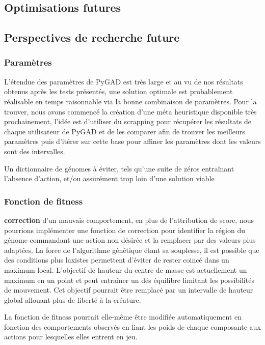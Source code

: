 \documentclass[journal, a4paper]{IEEEtran}
\begin{document}
\subsection{Optimisations futures}





\subsection{Perspectives de recherche future}

	\subsubsection{Paramètres}
	L'étendue des paramètres de PyGAD est très large et au vu de nos
	résultats obtenus après les tests présentés,
	une solution
	optimale est probablement réalisable en temps raisonnable via
	la bonne combinaison de paramètres.
	Pour la trouver, nous avons commencé la création d'une
	méta heuristique disponible très prochainement, l'idée est
	d'utiliser du scrapping pour récupérer les résultats de chaque
	utilisateur de PyGAD et de les comparer afin de trouver les
	meilleurs paramètres puis d'itérer sur cette base pour affiner
	les paramètres dont les valeurs sont des intervalles.

	Un dictionnaire de génomes à éviter, tels qu'une suite de zéros
	entraînant l'absence d'action, et/ou assurément trop loin d'une
	solution viable
	\subsubsection{Fonction de fitness}
	\textbf{correction} d'un mauvais comportement, en plus de
	l'attribution	de score, nous
	pourrions implémenter une fonction de correction pour identifier
	la région du génome commandant une action non désirée et la
	remplacer par des valeurs plus adaptées.
	La force de l'algorithme génétique étant sa souplesse, il est possible
	que des conditions plus laxistes permettent d'éviter de rester coincé
	dans un maximum local.
	L'objectif de hauteur du centre de masse est
	actuellement un maximum en un point et peut entraîner un dés
	équilibre limitant les possibilités de mouvement.
	Cet objectif pourrait être remplacé par	un intervalle de hauteur
	global allouant plus de liberté à la créature.

	La fonction de fitness pourrait elle-même être modifiée
	automatiquement en fonction des comportements observés en liant
	les poids de chaque composante aux actions pour lesquelles elles
	entrent en jeu.
\end{document}
